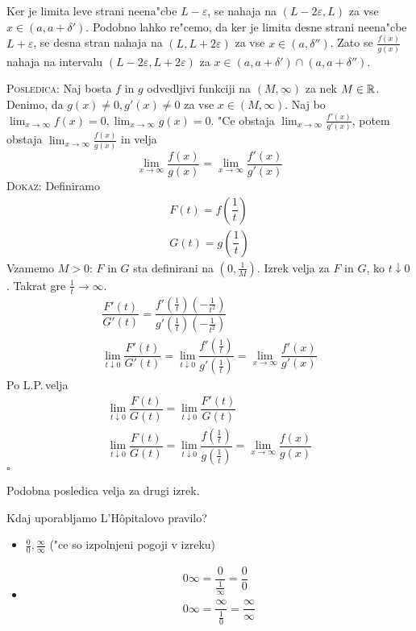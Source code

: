 Ker je limita leve strani neena"cbe $L - \varepsilon$, se nahaja na $(L - 2\varepsilon, L)$ za vse $x \in (a, a + \delta')$. Podobno lahko re"cemo, da ker je limita desne strani neena"cbe $L + \varepsilon$, se desna stran nahaja na $(L, L + 2\varepsilon)$ za vse $x \in (a, \delta'')$. Zato se $\frac{f(x)}{g(x)}$ nahaja na intervalu $(L - 2\varepsilon, L + 2\varepsilon)$ za $x \in (a, a + \delta') \cap (a, a + \delta'')$.

\textsc{Posledica:} Naj bosta $f$ in $g$ odvedljivi funkciji na $(M, \infty)$ za nek $M \in \mathbb{R}$. Denimo, da $g(x) \neq 0, g'(x) \neq 0$ za vse $x \in (M, \infty)$. Naj bo $\lim_{x \to \infty} f(x) = 0, \lim_{x \to \infty} g(x) = 0$. "Ce obstaja $\lim_{x \to \infty} \frac{f'(x)}{g'(x)}$, potem obstaja $\lim_{x \to \infty} \frac{f(x)}{g(x)}$ in velja
\begin{equation*}
\lim_{x \to \infty} \dfrac{f(x)}{g(x)} = \lim_{x \to \infty} \dfrac{f'(x)}{g'(x)}
\end{equation*}
\textsc{Dokaz:} Definiramo
\begin{gather*}
F(t) = f\left(\dfrac{1}{t}\right) \\
G(t) = g\left(\dfrac{1}{t}\right)
\end{gather*}
Vzamemo $M > 0$: $F$ in $G$ sta definirani na $\left(0, \frac{1}{M}\right)$. Izrek velja za $F$ in $G$, ko $t \downarrow 0$. Takrat gre $\frac{1}{t} \to \infty$.
\begin{gather*}
\dfrac{F'(t)}{G'(t)} = \dfrac{f'\left(\frac{1}{t}\right) \left(- \frac{1}{t^2}\right)}{g'\left(\frac{1}{t}\right) \left(- \frac{1}{t^2}\right)} \\
\lim_{t \downarrow 0} \dfrac{F'(t)}{G'(t)} = \lim_{t \downarrow 0} \dfrac{f'\left(\frac{1}{t}\right)}{g'\left(\frac{1}{t}\right)} = \lim_{x \to \infty} \dfrac{f'(x)}{g'(x)}
\end{gather*}
Po L.P.\,velja
\begin{gather*}
\lim_{t \downarrow 0} \dfrac{F(t)}{G(t)} = \lim_{t \downarrow 0} \dfrac{F'(t)}{G(t)} \\
\lim_{t \downarrow 0} \dfrac{F(t)}{G(t)} = \lim_{t \downarrow 0} \dfrac{f \left(\frac{1}{t}\right)}{g \left(\frac{1}{t}\right)} = \lim_{x \to \infty} \dfrac{f(x)}{g(x)}
\end{gather*}
\hfill $\square$

Podobna posledica velja za drugi izrek.

Kdaj uporabljamo L'H\^{o}pitalovo pravilo?
\begin{itemize}
	\item $\frac{ 0}{0}, \frac{\infty}{\infty}$ ("ce so izpolnjeni pogoji v izreku)
	\item 
	\begin{gather*}
		0 \infty = \dfrac{0}{\frac{1}{\infty}} = \dfrac{0}{0} \\
		0 \infty = \dfrac{\infty}{\frac{1}{0}} = \dfrac{\infty}{\infty}
	\end{gather*}
\end{itemize}
%
